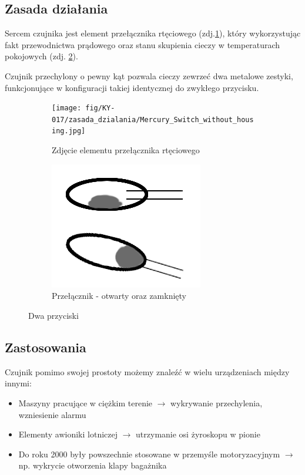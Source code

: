 \documentclass[11pt, a4paper]{article}
\begin{document}
\subsection{Zasada działania}
Sercem czujnika jest element przełącznika rtęciowego  (zdj.\ref{fig:sub1}), który wykorzystując fakt
przewodnictwa prądowego oraz stanu skupienia cieczy w temperaturach pokojowych (zdj. \ref{fig:sub2}).

Czujnik przechylony o pewny kąt pozwala cieczy zewrzeć dwa metalowe zestyki, funkcjonujące w konfiguracji
takiej identycznej do zwykłego przycisku.

\vspace{0.25cm}
\begin{figure}[h]
\centering
\begin{subfigure}{.5\textwidth}
  \centering
  \texttt{[image: fig/KY-017/zasada\_dzialania/Mercury\_Switch\_without\_housing.jpg]}
  \caption{Zdjęcie elementu przełącznika rtęciowego}
  
  \label{fig:sub1}
\end{subfigure}%
\begin{subfigure}{.5\textwidth}
  \centering
  \includegraphics[width=.4\linewidth]{fig/KY-017/zasada_dzialania/otw.png}
  \caption{Przełącznik - otwarty oraz zamknięty}
  \label{fig:sub2}
\end{subfigure}
\caption{Dwa przyciski}
\label{fig:test}
\end{figure}
\vspace{0.25cm}



\subsection{Zastosowania}
Czujnik pomimo swojej prostoty możemy znaleźć w wielu urządzeniach między innymi:

\begin{itemize}
    \item Maszyny pracujące w ciężkim terenie $\rightarrow$ wykrywanie przechylenia, wzniesienie alarmu
    \item Elementy awioniki lotniczej $\rightarrow$ utrzymanie osi żyroskopu w pionie
    \item Do roku 2000 były powszechnie stosowane w przemyśle motoryzacyjnym $\rightarrow$ np. wykrycie otworzenia klapy bagażnika
\end{itemize}
\vspace{0.5cm}
\end{document}
